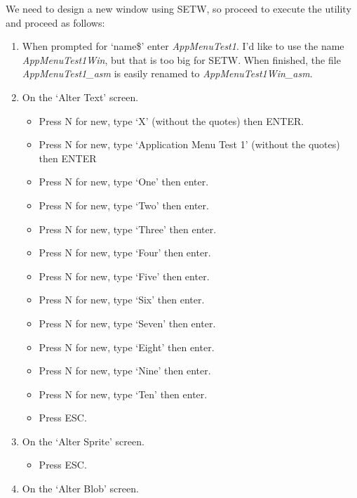 We need to design a new window using SETW, so proceed to execute the
    utility and proceed as follows:
\begin{enumerate}
\item{When prompted for `name\$' enter
 \emph{AppMenuTest1}. I'd like to use the name \emph{AppMenuTest1Win},
          but that is too big for SETW. When
          finished, the file \emph{AppMenuTest1\_asm} is easily
          renamed to \emph{AppMenuTest1Win\_asm}.
}
\item{On the `Alter Text' screen.
\begin{itemize}[itemsep=0pt]

\item{}Press N for new, type `X' (without the quotes) then
            ENTER.


\item{}Press N for new, type `Application Menu Test 1' (without the
            quotes) then ENTER


\item{}Press N for new, type `One' then enter.
\item{}Press N for new, type `Two' then enter.
\item{}Press N for new, type `Three' then enter.
\item{}Press N for new, type `Four' then enter.
\item{}Press N for new, type `Five' then enter.
\item{}Press N for new, type `Six' then enter.
\item{}Press N for new, type `Seven' then enter.
\item{}Press N for new, type `Eight' then enter.
\item{}Press N for new, type `Nine' then enter.
\item{}Press N for new, type `Ten' then enter.

\item{}Press ESC.


\end{itemize}
}
\item{On the `Alter Sprite' screen.
\begin{itemize}[itemsep=0pt]

\item{}Press ESC.

\end{itemize}
}
\item{On the `Alter Blob' screen.
\begin{itemize}[itemsep=0pt]


\end{itemize}}
\end{enumerate}
